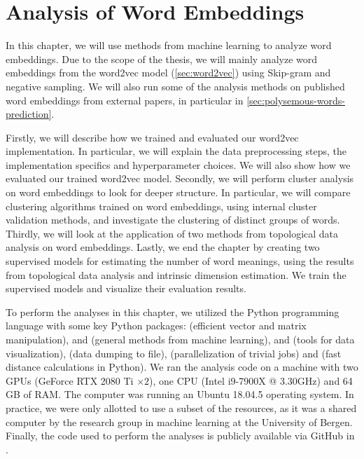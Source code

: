 \chapter{Analysis of Word Embeddings}
\label{chap:analysis-of-word-embeddings}
In this chapter, we will use methods from machine learning to analyze word embeddings. Due to the scope of the thesis, we will mainly analyze word embeddings from the word2vec model (\cref{sec:word2vec}) using Skip-gram and negative sampling. We will also run some of the analysis methods on published word embeddings from external papers, in particular in \cref{sec:polysemous-words-prediction}.

Firstly, we will describe how we trained and evaluated our word2vec implementation. In particular, we will explain the data preprocessing steps, the implementation specifics and hyperparameter choices. We will also show how we evaluated our trained word2vec model. Secondly, we will perform cluster analysis on word embeddings to look for deeper structure. In particular, we will compare clustering algorithms trained on word embeddings, using internal cluster validation methods, and investigate the clustering of distinct groups of words. Thirdly, we will look at the application of two methods from topological data analysis on word embeddings. Lastly, we end the chapter by creating two supervised models for estimating the number of word meanings, using the results from topological data analysis and intrinsic dimension estimation. We train the supervised models and visualize their evaluation results.

To perform the analyses in this chapter, we utilized the Python programming language with some key Python packages:  \cite{2020NumPy-Array} (efficient vector and matrix manipulation),  \cite{ScikitLearn2011} and  \cite{2020SciPy-NMeth} (general methods from machine learning),  \cite{Matplotlib2007} and  \cite{seaborn2021} (tools for data visualization),  \cite{joblib2021} (data dumping to file),  \cite{sharedmem2020} (parallelization of trivial jobs) and  \cite{fastdist2021} (fast distance calculations in Python). We ran the analysis code on a machine with two GPUs (GeForce RTX 2080 Ti $\times2$), one CPU (Intel i9-7900X @ 3.30GHz) and 64 GB of RAM. The computer was running an Ubuntu 18.04.5 operating system. In practice, we were only allotted to use a subset of the resources, as it was a shared computer by the research group in machine learning at the University of Bergen. Finally, the code used to perform the analyses is publicly available via GitHub in \cite{Triki2021}.



